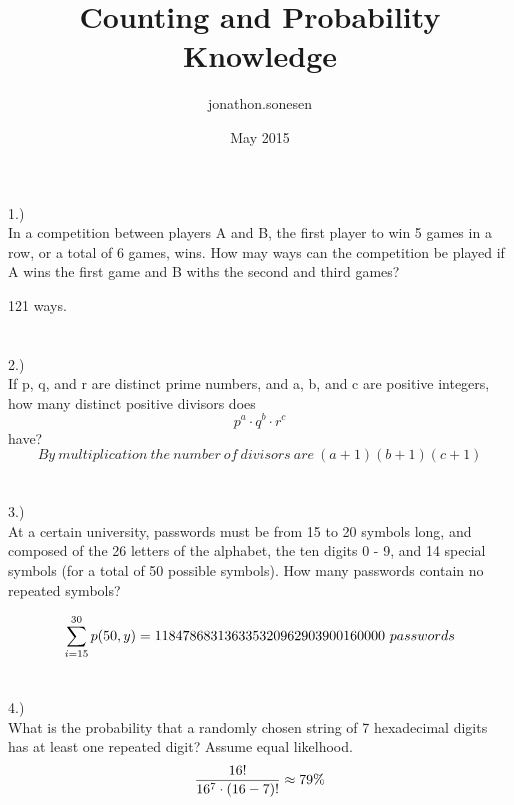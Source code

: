 \documentclass[fleqn]{article}
\title{Counting and Probability Knowledge}
\author{jonathon.sonesen }
\date{May 2015}
\begin{document}
\maketitle
\section*{}
1.)\\
In a competition between players A and B, the first player to win 5 games
in a row, or a total of 6 games, wins. How may ways can the competition be
played if A wins the first game and B withs the second and third games?

121 ways.
\section*{}
2.)\\
If p, q, and r are distinct prime numbers, and a, b, and c are positive integers,
how many distinct positive divisors does 
\begin{equation*}p^a \cdot q^b \cdot r^c \end{equation*} have?
\begin{equation*}
  By~multiplication~the~number~of~divisors~are~ (a+1)(b+1)(c+1)
\end{equation*}

 
\section*{}
3.)\\
At a certain university, passwords must be from 15 to 20 symbols long, and
composed of the 26 letters of the alphabet, the ten digits 0 - 9, and 14 special
symbols (for a total of 50 possible symbols). How many passwords contain
no repeated symbols?

\begin{equation*}
  \sum\limits_{i=15}^{30}p(50,y)
  = 118478683136335320962903900160000~passwords\\
\end{equation*}

 
\section*{}
4.)\\
What is the probability that a randomly chosen string of 7 hexadecimal digits 
has at least one repeated digit? Assume equal likelhood.\\


\begin{equation*}
  \frac{16!}{16^7 \cdot (16-7)!} \approx 79\%\\
\end{equation*}
\end{document}
